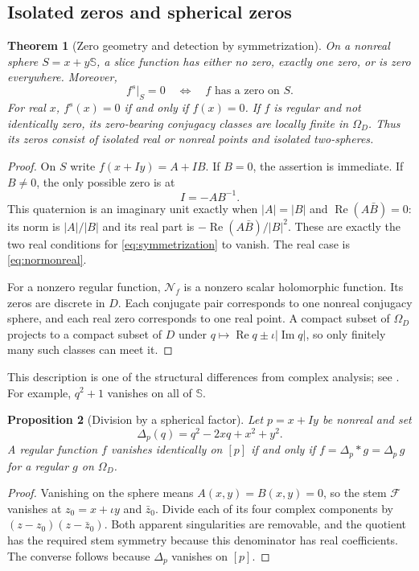 \documentclass[11pt,a4paper]{article}
\numberwithin{equation}{section}
\newtheorem{theorem}{Theorem}[section]
\newtheorem{proposition}[theorem]{Proposition}
\theoremstyle{definition}
\theoremstyle{remark}
\newcommand{\SSS}{\mathbb S}
\newcommand{\Rea}{\operatorname{Re}}
\newcommand{\Ima}{\operatorname{Im}}
\newcommand{\Norm}{\mathcal N}
\begin{document}
\subsection{Isolated zeros and spherical zeros}
\begin{theorem}[Zero geometry and detection by symmetrization]
\label{thm:zeros}
On a nonreal sphere $S=x+y\SSS$, a slice function has either no zero,
exactly one zero, or is zero everywhere. Moreover,
\begin{equation}
 f^s\big|_S=0
 \quad\Longleftrightarrow\quad
 f\text{ has a zero on }S.
 \label{eq:zero-detection}
\end{equation}
For real $x$, $f^s(x)=0$ if and only if $f(x)=0$.
If $f$ is regular and not identically zero, its zero-bearing conjugacy classes
are locally finite in $\Omega_D$. Thus its zeros consist of isolated real or
nonreal points and isolated two-spheres.
\end{theorem}
\begin{proof}
On $S$ write $f(x+Iy)=A+IB$. If $B=0$, the assertion is immediate. If
$B\ne0$, the only possible zero is at
\[
 I=-AB^{-1}.
\]
This quaternion is an imaginary unit exactly when
$|A|=|B|$ and $\Rea(A\bar B)=0$: its norm is $|A|/|B|$ and its real part
is $-\Rea(A\bar B)/|B|^2$. These are exactly the two real conditions for
\eqref{eq:symmetrization} to vanish. The real case is
\eqref{eq:normonreal}.

For a nonzero regular function, $\Norm_f$ is a nonzero scalar holomorphic
function. Its zeros are discrete in $D$. Each conjugate pair corresponds to
one nonreal conjugacy sphere, and each real zero corresponds to one real
point. A compact subset of $\Omega_D$ projects to a compact subset of $D$
under $q\mapsto\Rea q\pm\iota|\Ima q|$, so only finitely many such classes
can meet it.
\end{proof}
This description is one of the structural differences from complex analysis;
see \cite{GStZeros,GP}. For example, $q^2+1$ vanishes on all of $\SSS$.

\begin{proposition}[Division by a spherical factor]
\label{prop:spherical-division}
Let $p=x+Iy$ be nonreal and set
\[
 \Delta_p(q)=q^2-2xq+x^2+y^2.
\]
A regular function $f$ vanishes identically on $[p]$ if and only if
$f=\Delta_p*g=\Delta_p\,g$ for a regular $g$ on $\Omega_D$.
\end{proposition}
\begin{proof}
Vanishing on the sphere means $A(x,y)=B(x,y)=0$, so the stem $\mathcal F$
vanishes at $z_0=x+\iota y$ and $\bar z_0$. Divide each of its four complex
components by $(z-z_0)(z-\bar z_0)$. Both apparent singularities are removable,
and the quotient has the required stem symmetry because this denominator has
real coefficients. The converse follows because $\Delta_p$ vanishes on $[p]$.
\end{proof}
\end{document}
